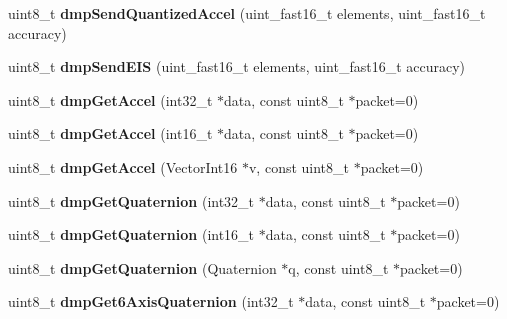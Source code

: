 \begin{DoxyCompactItemize}
\item 
\mbox{\label{classMPU6050_a7383c4681b040cefc31d472362b7aeb2}} 
uint8\+\_\+t {\bfseries dmp\+Send\+Quantized\+Accel} (uint\+\_\+fast16\+\_\+t elements, uint\+\_\+fast16\+\_\+t accuracy)
\item 
\mbox{\label{classMPU6050_a628d208cf85fcf46b3e100880e332e19}} 
uint8\+\_\+t {\bfseries dmp\+Send\+E\+IS} (uint\+\_\+fast16\+\_\+t elements, uint\+\_\+fast16\+\_\+t accuracy)
\item 
\mbox{\label{classMPU6050_a113be793514449548008fe1eae5459ef}} 
uint8\+\_\+t {\bfseries dmp\+Get\+Accel} (int32\+\_\+t $\ast$data, const uint8\+\_\+t $\ast$packet=0)
\item 
\mbox{\label{classMPU6050_a7fdca0e0bf7d8a20818c28d4ed734647}} 
uint8\+\_\+t {\bfseries dmp\+Get\+Accel} (int16\+\_\+t $\ast$data, const uint8\+\_\+t $\ast$packet=0)
\item 
\mbox{\label{classMPU6050_a31018c8a11a8a87725faab59bb948da7}} 
uint8\+\_\+t {\bfseries dmp\+Get\+Accel} (Vector\+Int16 $\ast$v, const uint8\+\_\+t $\ast$packet=0)
\item 
\mbox{\label{classMPU6050_aac2d2a0de3fd26e37b8341206fc26260}} 
uint8\+\_\+t {\bfseries dmp\+Get\+Quaternion} (int32\+\_\+t $\ast$data, const uint8\+\_\+t $\ast$packet=0)
\item 
\mbox{\label{classMPU6050_a96eacd8075f484bad2376c95b0defb26}} 
uint8\+\_\+t {\bfseries dmp\+Get\+Quaternion} (int16\+\_\+t $\ast$data, const uint8\+\_\+t $\ast$packet=0)
\item 
\mbox{\label{classMPU6050_a712866736969fb002303c55effc627cb}} 
uint8\+\_\+t {\bfseries dmp\+Get\+Quaternion} (Quaternion $\ast$q, const uint8\+\_\+t $\ast$packet=0)
\item 
\mbox{\label{classMPU6050_a776c9ba67375bfe59432e7f78c7eab87}} 
uint8\+\_\+t {\bfseries dmp\+Get6\+Axis\+Quaternion} (int32\+\_\+t $\ast$data, const uint8\+\_\+t $\ast$packet=0)
\item 
\mbox{\label{classMPU6050_a9c074fce94329c3f41aa6cddc2080358}} 

\end{DoxyCompactItemize}
